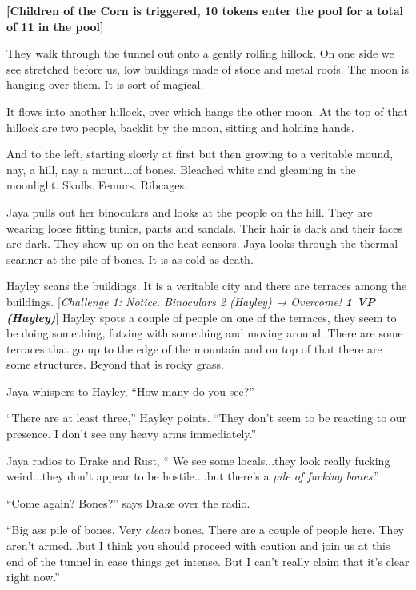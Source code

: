 \textbf{{[}Children of the Corn is triggered, 10 tokens enter the pool for a total of 11 in the pool{]}}



They walk through the tunnel out onto a gently rolling hillock.  On one side we see stretched before us, low buildings made of stone and metal roofs. The moon is hanging over them.  It is sort of magical.  



It flows into another hillock, over which hangs the other moon.  At the top of that hillock are two people, backlit by the moon, sitting and holding hands.  



And to the left, starting slowly at first but then growing to a veritable mound, nay, a hill, nay a mount...of bones.  Bleached white and gleaming in the moonlight.  Skulls.  Femurs.  Ribcages.



Jaya pulls out her binoculars and looks at the people on the hill.  They are wearing loose fitting tunics, pants and sandals.  Their hair is dark and their faces are dark.  They show up on on the heat sensors.  Jaya looks through the thermal scanner at the pile of bones.  It is as cold as death.

Hayley scans the buildings.  It is a veritable city and there are terraces among the buildings.  {[}\textit{Challenge 1: Notice.  Binoculars 2 (Hayley) → Overcome! }\textit{\textbf{1 VP (Hayley)}}{]}  Hayley spots a couple of people on one of the terraces, they seem to be doing something, futzing with something and moving around.  There are some terraces that go up to the edge of the mountain and on top of that there are some structures.  Beyond that is rocky grass.

Jaya whispers to Hayley, ``How many do you see?''

``There are at least three,'' Hayley points.  ``They don't seem to be reacting to our presence.  I don't see any heavy arms immediately.''



Jaya radios to Drake and Rust, `` We see some locals...they look really fucking weird...they don't appear to be hostile....but there's a \textit{pile of fucking bones}.''

``Come again?  Bones?'' says Drake over the radio.

``Big ass pile of bones.  Very \textit{clean }bones. There are a couple of people here.  They aren't armed...but I think you should proceed with caution and join us at this end of the tunnel in case things get intense.  But I can't really claim that it's clear right now.''

